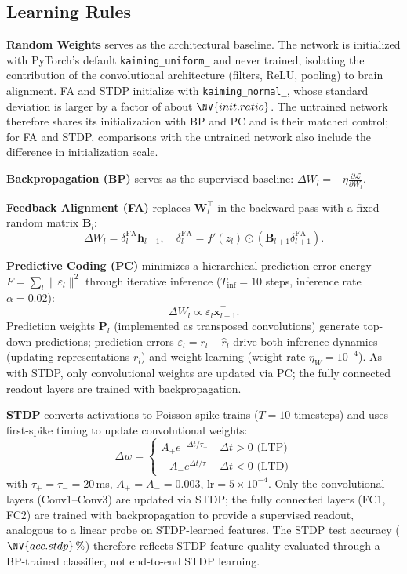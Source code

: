 \documentclass[10pt,twocolumn]{article}
\begin{document}
\subsection{Learning Rules}

\textbf{Random Weights} serves as the architectural baseline. The network is initialized with PyTorch's default \texttt{kaiming\_uniform\_} and never trained, isolating the contribution of the convolutional architecture (filters, ReLU, pooling) to brain alignment. FA and STDP initialize with \texttt{kaiming\_normal\_}, whose standard deviation is larger by a factor of about $\NV{init.ratio}$. The untrained network therefore shares its initialization with BP and PC and is their matched control; for FA and STDP, comparisons with the untrained network also include the difference in initialization scale.

\textbf{Backpropagation (BP)} serves as the supervised baseline: $\Delta W_l = -\eta \frac{\partial \mathcal{L}}{\partial W_l}$.

\textbf{Feedback Alignment (FA)} \citep{lillicrap2016} replaces $\mathbf{W}_l^\top$ in the backward pass with a fixed random matrix $\mathbf{B}_l$:
\begin{equation}
\Delta W_l = \delta_l^{\text{FA}} \mathbf{h}_{l-1}^\top, \quad \delta_l^{\text{FA}} = f'(z_l) \odot (\mathbf{B}_{l+1} \delta_{l+1}^{\text{FA}}).
\end{equation}

\textbf{Predictive Coding (PC)} \citep{rao1999, whittington2017} minimizes a hierarchical prediction-error energy $F = \sum_l \|\varepsilon_l\|^2$ through iterative inference ($T_{\text{inf}} = 10$ steps, inference rate $\alpha = 0.02$):
\begin{equation}
\Delta W_l \propto \varepsilon_l \mathbf{x}_{l-1}^\top.
\end{equation}
Prediction weights $\mathbf{P}_l$ (implemented as transposed convolutions) generate top-down predictions; prediction errors $\varepsilon_l = r_l - \hat{r}_l$ drive both inference dynamics (updating representations $r_l$) and weight learning (weight rate $\eta_W = 10^{-4}$). As with STDP, only convolutional weights are updated via PC; the fully connected readout layers are trained with backpropagation.

\textbf{STDP} \citep{bi1998} converts activations to Poisson spike trains ($T = 10$ timesteps) and uses first-spike timing to update convolutional weights:
\begin{equation}
\Delta w = \begin{cases} A_+ e^{-\Delta t / \tau_+} & \Delta t > 0 \text{ (LTP)} \\ -A_- e^{\Delta t / \tau_-} & \Delta t < 0 \text{ (LTD)} \end{cases}
\end{equation}
with $\tau_+ = \tau_- = 20$\,ms, $A_+ = A_- = 0.003$, $\text{lr} = 5 \times 10^{-4}$. Only the convolutional layers (Conv1--Conv3) are updated via STDP; the fully connected layers (FC1, FC2) are trained with backpropagation to provide a supervised readout, analogous to a linear probe on STDP-learned features. The STDP test accuracy ($\NV{acc.stdp}\,\%$) therefore reflects STDP feature quality evaluated through a BP-trained classifier, not end-to-end STDP learning.
\end{document}
